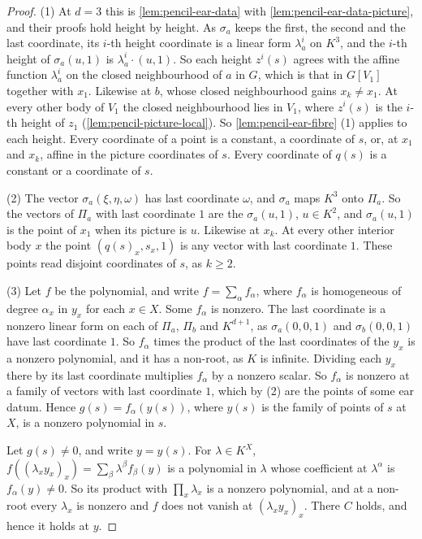 \begin{proof}
  \leanok
  (1) At $d = 3$ this is \cref{lem:pencil-ear-data} with
  \cref{lem:pencil-ear-data-picture}, and their proofs hold height by
  height. As $\sigma_a$ keeps the first, the second and the last
  coordinate, its $i$-th height coordinate is a linear form
  $\lambda^i_a$ on $K^3$, and the $i$-th height of $\sigma_a(u, 1)$ is
  $\lambda^i_a \cdot (u, 1)$. So each height $z^i(s)$ agrees with the
  affine function $\lambda^i_a$ on the closed neighbourhood of $a$ in $G$,
  which is that in $G[V_1]$ together with $x_1$. Likewise at $b$, whose
  closed neighbourhood gains $x_k \neq x_1$. At every other body of $V_1$
  the closed neighbourhood lies in $V_1$, where $z^i(s)$ is the $i$-th
  height of $z_1$ (\cref{lem:pencil-picture-local}). So
  \cref{lem:pencil-ear-fibre} (1) applies to each height. Every
  coordinate of a point is a constant, a coordinate of $s$, or, at $x_1$
  and $x_k$, affine in the picture coordinates of $s$. Every coordinate
  of $q(s)$ is a constant or a coordinate of $s$.

  (2) The vector $\sigma_a(\xi, \eta, \omega)$ has last coordinate
  $\omega$, and $\sigma_a$ maps $K^3$ onto $\Pi_a$. So the vectors of
  $\Pi_a$ with last coordinate $1$ are the $\sigma_a(u, 1)$, $u \in K^2$,
  and $\sigma_a(u, 1)$ is the point of $x_1$ when its picture is $u$.
  Likewise at $x_k$. At every other interior body $x$ the point
  $(q(s)_x, s_x, 1)$ is any vector with last coordinate $1$. These points
  read disjoint coordinates of $s$, as $k \ge 2$.

  (3) Let $f$ be the polynomial, and write $f = \sum_\alpha f_\alpha$,
  where $f_\alpha$ is homogeneous of degree $\alpha_x$ in $y_x$ for each
  $x \in X$. Some $f_\alpha$ is nonzero. The last coordinate is a nonzero
  linear form on each of $\Pi_a$, $\Pi_b$ and $K^{d+1}$, as
  $\sigma_a(0, 0, 1)$ and $\sigma_b(0, 0, 1)$ have last coordinate $1$.
  So $f_\alpha$ times the product of the last coordinates of the $y_x$ is
  a nonzero polynomial, and it has a non-root, as $K$ is infinite.
  Dividing each $y_x$ there by its last coordinate multiplies $f_\alpha$
  by a nonzero scalar. So $f_\alpha$ is nonzero at a family of vectors
  with last coordinate $1$, which by (2) are the points of some ear
  datum. Hence $g(s) = f_\alpha(y(s))$, where $y(s)$ is the family of
  points of $s$ at $X$, is a nonzero polynomial in $s$.

  Let $g(s) \neq 0$, and write $y = y(s)$. For $\lambda \in K^X$,
  $f((\lambda_x y_x)_x) = \sum_\beta \lambda^\beta f_\beta(y)$ is a
  polynomial in $\lambda$ whose coefficient at $\lambda^\alpha$ is
  $f_\alpha(y) \neq 0$. So its product with $\prod_x \lambda_x$ is a
  nonzero polynomial, and at a non-root every $\lambda_x$ is nonzero and
  $f$ does not vanish at $(\lambda_x y_x)_x$. There $C$ holds, and hence
  it holds at $y$.
\end{proof}


